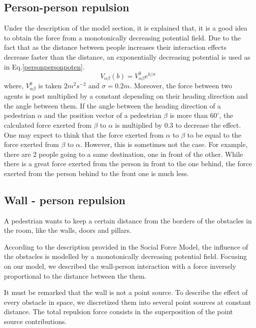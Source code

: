 \documentclass[11pt]{article}
\begin{document}
\subsection{Person-person repulsion}
Under the description of the model section, it is explained that, it is a good idea to obtain the force from a monotonically decreasing potential field. Due to the fact that as the distance between people increases their interaction effects decrease faster than the distance, an exponentially decreasing potential is used as in Eq.\ref{personpersonpoten}.
\begin{equation}
    V_{\alpha\beta}(b)=V^0_{\alpha\beta}e^{b/\sigma}
    \label{personpersonpoten}
\end{equation}
where, $V^0_{\alpha\beta}$ is taken $2m^2s^{-2}$ and $\sigma=0.2m$. Moreover, the force between two agents is post multiplied by a constant depending on their heading direction and the angle between them. If the angle between the heading direction of a pedestrian $\alpha$ and the position vector of a pedestrian $\beta$ is more than $60^\circ$, the calculated force exerted from $\beta$ to $\alpha$ is multiplied by 0.3 to decrease the effect. One may expect to think that the force exerted from $\alpha$ to $\beta$ to be equal to the force exerted from $\beta$ to $\alpha$. However, this is sometimes not the case. For example, there are 2 people going to a same destination, one in front of the other. While there is a great force exerted from the person in front to the one behind, the force exerted from the person behind to the front one is much less.

\subsection{Wall - person repulsion}
A pedestrian wants to keep a certain distance from the borders of the obstacles in the room, like the walls, doors and pillars.

According to the description provided in the Social Force Model, the influence of the obstacles is modelled by a monotonically decreasing potential field. Focusing on our model, we described the wall-person interaction with a force inversely proportional to the distance between the them.

It must be remarked that the wall is not a point source. To describe the effect of every obstacle in space, we discretized them into several point sources at constant distance. The total repulsion force consists in the superposition of the point source contributions.
\end{document}
